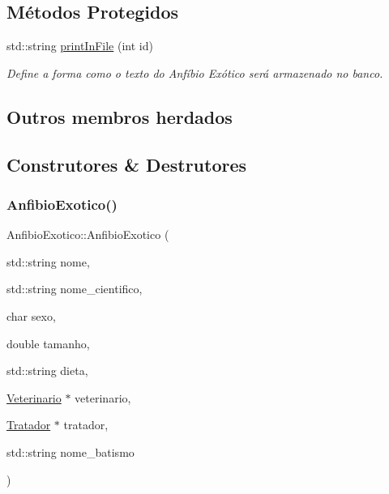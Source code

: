 \subsection*{Métodos Protegidos}
\begin{DoxyCompactItemize}
\item 
std\+::string \hyperlink{classAnfibioExotico_a08d9debec54258a0f43c8c503dfb23d0}{print\+In\+File} (int id)
\begin{DoxyCompactList}\small\item\em Define a forma como o texto do Anfíbio Exótico será armazenado no banco. \end{DoxyCompactList}\end{DoxyCompactItemize}
\subsection*{Outros membros herdados}


\subsection{Construtores \& Destrutores}
\mbox{\label{classAnfibioExotico_a9c6535c2c202776c0837e4b917589dd6}} 
\subsubsection{\texorpdfstring{Anfibio\+Exotico()}{AnfibioExotico()}\hspace{0.1cm}{\footnotesize\ttfamily [1/2]}}
{\footnotesize\ttfamily Anfibio\+Exotico\+::\+Anfibio\+Exotico (\begin{DoxyParamCaption}\item[{std\+::string}]{nome,  }\item[{std\+::string}]{nome\+\_\+cientifico,  }\item[{char}]{sexo,  }\item[{double}]{tamanho,  }\item[{std\+::string}]{dieta,  }\item[{\hyperlink{classVeterinario}{Veterinario} $\ast$}]{veterinario,  }\item[{\hyperlink{classTratador}{Tratador} $\ast$}]{tratador,  }\item[{std\+::string}]{nome\+\_\+batismo }\end{DoxyParamCaption})}



